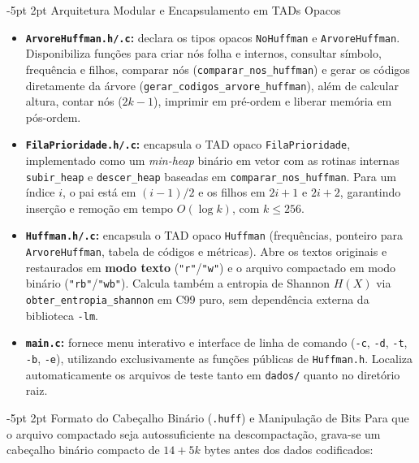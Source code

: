 \documentclass[a4paper,10pt]{article}
\makeatletter
\renewcommand\subsection{\@startsection{subsection}{2}{\z@}%
                                     {-5pt \@plus -1pt \@minus -1pt}%
                                     {2pt \@plus 1pt}%
                                     {\normalfont\normalsize\bfseries}}
\makeatother
\begin{document}
\subsection{Arquitetura Modular e Encapsulamento em TADs Opacos}
\begin{itemize}\setlength{\itemsep}{1.5pt}\setlength{\parskip}{0pt}\setlength{\topsep}{2pt}
  \item \textbf{\texttt{ArvoreHuffman.h/.c}:} declara os tipos opacos \texttt{NoHuffman} e \texttt{ArvoreHuffman}. Disponibiliza funções para criar nós folha e internos, consultar símbolo, frequência e filhos, comparar nós (\texttt{comparar\_nos\_huffman}) e gerar os códigos diretamente da árvore (\texttt{gerar\_codigos\_arvore\_huffman}), além de calcular altura, contar nós ($2k - 1$), imprimir em pré-ordem e liberar memória em pós-ordem.
  \item \textbf{\texttt{FilaPrioridade.h/.c}:} encapsula o TAD opaco \texttt{FilaPrioridade}, implementado como um \emph{min-heap} binário em vetor com as rotinas internas \texttt{subir\_heap} e \texttt{descer\_heap} baseadas em \texttt{comparar\_nos\_huffman}. Para um índice $i$, o pai está em $(i-1)/2$ e os filhos em $2i+1$ e $2i+2$, garantindo inserção e remoção em tempo $O(\log k)$, com $k \le 256$.
  \item \textbf{\texttt{Huffman.h/.c}:} encapsula o TAD opaco \texttt{Huffman} (frequências, ponteiro para \texttt{ArvoreHuffman}, tabela de códigos e métricas). Abre os textos originais e restaurados em \textbf{modo texto} (\texttt{"r"}/\texttt{"w"}) e o arquivo compactado em modo binário (\texttt{"rb"}/\texttt{"wb"}). Calcula também a entropia de Shannon $H(X)$ via \texttt{obter\_entropia\_shannon} em C99 puro, sem dependência externa da biblioteca \texttt{-lm}.
  \item \textbf{\texttt{main.c}:} fornece menu interativo e interface de linha de comando (\texttt{-c}, \texttt{-d}, \texttt{-t}, \texttt{-b}, \texttt{-e}), utilizando exclusivamente as funções públicas de \texttt{Huffman.h}. Localiza automaticamente os arquivos de teste tanto em \texttt{dados/} quanto no diretório raiz.
\end{itemize}

\subsection{Formato do Cabeçalho Binário (\texttt{.huff}) e Manipulação de Bits}
Para que o arquivo compactado seja autossuficiente na descompactação, grava-se um cabeçalho binário compacto de $14 + 5k$ bytes antes dos dados codificados:
\end{document}
